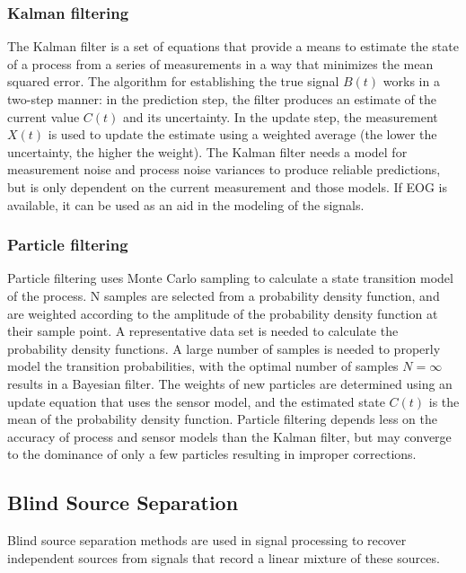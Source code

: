 \documentclass[twoside]{article}
\begin{document}
\subsubsection{Kalman filtering \cite{kalman} \cite{adaptivewiener} \cite{kalmaneeg} \cite{ieee}}
The Kalman filter is a set of equations that provide a means to estimate the state of a process from a series of measurements in a way that minimizes the mean squared error. The algorithm for establishing the true signal $B(t)$ works in a two-step manner: in the prediction step, the filter produces an estimate of the current value $C(t)$ and its uncertainty. In the update step, the measurement $X(t)$ is used to update the estimate using a weighted average (the lower the uncertainty, the higher the weight). The Kalman filter needs a model for measurement noise and process noise variances to produce reliable predictions, but is only dependent on the current measurement and those models. If EOG is available, it can be used as an aid in the modeling of the signals. 


\subsubsection{Particle filtering \cite{ieee}}
Particle filtering uses Monte Carlo sampling to calculate a state transition model of the process. N samples are selected from a probability density function, and are weighted according to the amplitude of the probability density function at their sample point. A representative data set is needed to calculate the probability density functions. A large number of samples is needed to properly model the transition probabilities, with the optimal number of samples $N = \infty$ results in a Bayesian filter. The weights of new particles are determined using an update equation that uses the sensor model, and the estimated state $C(t)$ is the mean of the probability density function. Particle filtering depends less on the accuracy of process and sensor models than the Kalman filter, but may converge to the dominance of only a few particles resulting in improper corrections. 



\subsection{Blind Source Separation}
Blind source separation methods are used in signal processing to recover independent sources from signals that record a linear mixture of these sources. 
\end{document}

